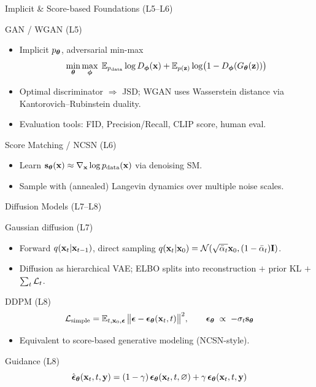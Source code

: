 \documentclass{beamer}
\begin{document}
\begin{frame}{Implicit \& Score-based Foundations (L5--L6)}
	\begin{block}{GAN / WGAN (L5)}
		\begin{itemize}
			\item Implicit $p_{\boldsymbol{\theta}}$, adversarial min-max
			\[
				\min_{\boldsymbol{\theta}}\max_{\boldsymbol{\phi}}\;\mathbb{E}_{p_{\text{data}}}\log D_{\boldsymbol{\phi}}(\mathbf{x}) + \mathbb{E}_{p(\mathbf{z})}\log\bigl(1-D_{\boldsymbol{\phi}}(G_{\boldsymbol{\theta}}(\mathbf{z}))\bigr)
			\]
			\item Optimal discriminator $\Rightarrow$ JSD; WGAN uses Wasserstein distance via Kantorovich--Rubinstein duality.
			\item Evaluation tools: FID, Precision/Recall, CLIP score, human eval.
		\end{itemize}
	\end{block}
	\begin{block}{Score Matching / NCSN (L6)}
		\begin{itemize}
			\item Learn $\mathbf{s}_{\boldsymbol{\theta}}(\mathbf{x})\approx\nabla_{\mathbf{x}}\log p_{\text{data}}(\mathbf{x})$ via denoising SM.
			\item Sample with (annealed) Langevin dynamics over multiple noise scales.
		\end{itemize}
	\end{block}
\end{frame}
\begin{frame}{Diffusion Models (L7--L8)}
	\begin{block}{Gaussian diffusion (L7)}
		\begin{itemize}
			\item Forward $q(\mathbf{x}_t|\mathbf{x}_{t-1})$, direct sampling $q(\mathbf{x}_t|\mathbf{x}_0)=\mathcal{N}(\sqrt{\bar\alpha_t}\mathbf{x}_0,(1-\bar\alpha_t)\mathbf{I})$.
			\item Diffusion as hierarchical VAE; ELBO splits into reconstruction $+$ prior KL $+$ $\sum_t \mathcal{L}_t$.
		\end{itemize}
	\end{block}
	\begin{block}{DDPM (L8)}
		\vspace{-0.3cm}
		\[
			\mathcal{L}_{\text{simple}} = \mathbb{E}_{t,\mathbf{x}_0,\boldsymbol{\epsilon}}\,\bigl\|\boldsymbol{\epsilon}-\boldsymbol{\epsilon}_{\boldsymbol{\theta}}(\mathbf{x}_t,t)\bigr\|^2,
			\qquad \boldsymbol{\epsilon}_{\boldsymbol{\theta}} \;\propto\; -\sigma_t \mathbf{s}_{\boldsymbol{\theta}}
		\]
		\vspace{-0.3cm}
		\begin{itemize}
			\item Equivalent to score-based generative modeling (NCSN-style).
		\end{itemize}
	\end{block}
	\begin{block}{Guidance (L8)}
		\vspace{-0.3cm}
		\[
			\hat{\boldsymbol{\epsilon}}_{\boldsymbol{\theta}}(\mathbf{x}_t,t,\mathbf{y})
			= (1-\gamma)\,\boldsymbol{\epsilon}_{\boldsymbol{\theta}}(\mathbf{x}_t,t,\varnothing) + \gamma\,\boldsymbol{\epsilon}_{\boldsymbol{\theta}}(\mathbf{x}_t,t,\mathbf{y})
		\]
	\end{block}
\end{frame}
\end{document}
